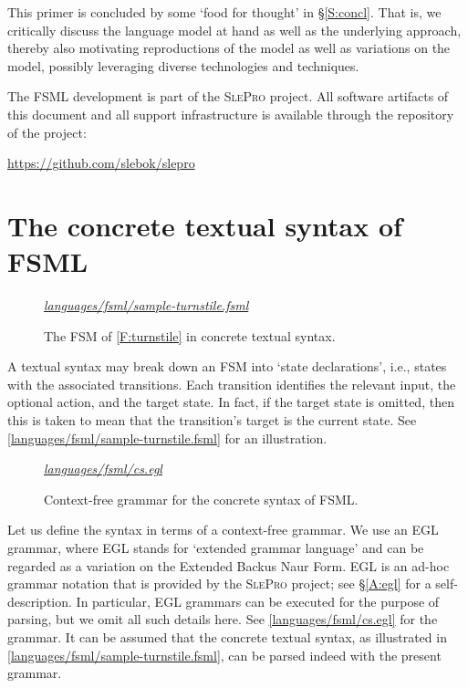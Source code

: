 \documentclass[preprint,authoryear,12pt]{noelsarticle}
\newcommand{\slepro}{\textsc{SlePro}}
\newcommand{\codefigure}[3]{
\begin{figure}[t!]
\begin{boxedminipage}{\hsize}
\mbox{}\hfill{}{\small\textit{\href{http://github.com/slebok/slepro/tree/master/#2}{#2}}}

\end{boxedminipage}
\caption{#1.}
\label{#2}
\medskip
\end{figure}}
\begin{document}
This primer is concluded by some `food for thought' in
\S\ref{S:concl}. That is, we critically discuss the language model at
hand as well as the underlying approach, thereby also motivating
reproductions of the model as well as variations on the model,
possibly leveraging diverse technologies and techniques.

The FSML development is part of the \slepro{} project. All software
artifacts of this document and all support infrastructure is available
through the repository of the project:

\begin{center}
\url{https://github.com/slebok/slepro}
\end{center}


\section{The concrete textual syntax of FSML}
\label{S:textual}

\codefigure{%
The FSM of \autoref{F:turnstile} in concrete textual syntax}{%
languages/fsml/sample-turnstile.fsml}{%
fsml}

A textual syntax may break down an FSM into `state declarations',
i.e., states with the associated transitions. Each transition
identifies the relevant input, the optional action, and the target
state. In fact, if the target state is omitted, then this is taken to
mean that the transition's target is the current state. See
\autoref{languages/fsml/sample-turnstile.fsml} for an illustration.

\codefigure{%
Context-free grammar for the concrete syntax of FSML}{%
languages/fsml/cs.egl}{%
egl}

Let us define the syntax in terms of a context-free grammar. We use an
EGL grammar, where EGL stands for `extended grammar language' and can
be regarded as a variation on the Extended Backus Naur Form. EGL is an
ad-hoc grammar notation that is provided by the \slepro{} project; see
\S\ref{A:egl} for a self-description. In particular, EGL grammars can
be executed for the purpose of parsing, but we omit all such details
here. See \autoref{languages/fsml/cs.egl} for the grammar. It can be
assumed that the concrete textual syntax, as illustrated in
\autoref{languages/fsml/sample-turnstile.fsml}, can be parsed indeed
with the present grammar.

\end{document}
